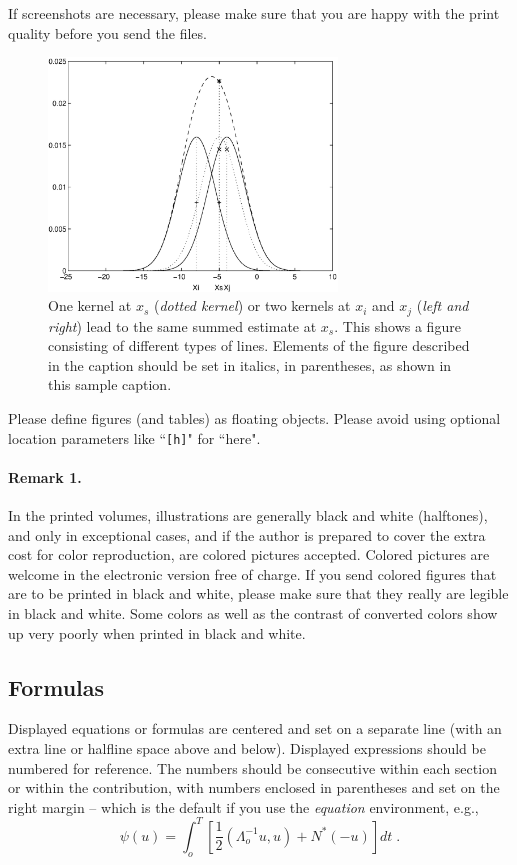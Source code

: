 \documentclass[runningheads,a4paper]{llncs}
\begin{document}
If screenshots are necessary, please make sure that you are happy with
the print quality before you send the files.
\begin{figure}
\centering
\includegraphics[height=6.2cm]{eijkel2}
\caption{One kernel at $x_s$ (\emph{dotted kernel}) or two kernels at
$x_i$ and $x_j$ (\textit{left and right}) lead to the same summed estimate
at $x_s$. This shows a figure consisting of different types of
lines. Elements of the figure described in the caption should be set in
italics, in parentheses, as shown in this sample caption.}
\label{fig:example}
\end{figure}

Please define figures (and tables) as floating objects. Please avoid
using optional location parameters like ``\verb+[h]+" for ``here".

\paragraph{Remark 1.}

In the printed volumes, illustrations are generally black and white
(halftones), and only in exceptional cases, and if the author is
prepared to cover the extra cost for color reproduction, are colored
pictures accepted. Colored pictures are welcome in the electronic
version free of charge. If you send colored figures that are to be
printed in black and white, please make sure that they really are
legible in black and white. Some colors as well as the contrast of
converted colors show up very poorly when printed in black and white.

\subsection{Formulas}

Displayed equations or formulas are centered and set on a separate
line (with an extra line or halfline space above and below). Displayed
expressions should be numbered for reference. The numbers should be
consecutive within each section or within the contribution,
with numbers enclosed in parentheses and set on the right margin --
which is the default if you use the \emph{equation} environment, e.g.,
\begin{equation}
  \psi (u) = \int_{o}^{T} \left[\frac{1}{2}
  \left(\Lambda_{o}^{-1} u,u\right) + N^{\ast} (-u)\right] dt \;  .
\end{equation}
\end{document}
